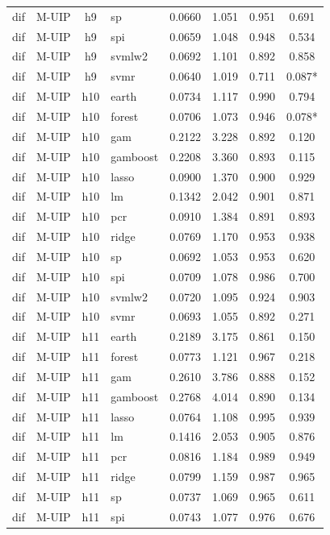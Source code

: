\begin{ThreePartTable}
\begin{longtable}[t]{llclcccc}
dif & M-UIP & h9 & sp & 0.0660 & 1.051 & 0.951 & 0.691\\
dif & M-UIP & h9 & spi & 0.0659 & 1.048 & 0.948 & 0.534\\
dif & M-UIP & h9 & svmlw2 & 0.0692 & 1.101 & 0.892 & 0.858\\
dif & M-UIP & h9 & svmr & 0.0640 & 1.019 & 0.711 & 0.087*\\
\addlinespace
dif & M-UIP & h10 & earth & 0.0734 & 1.117 & 0.990 & 0.794\\
dif & M-UIP & h10 & forest & 0.0706 & 1.073 & 0.946 & 0.078*\\
dif & M-UIP & h10 & gam & 0.2122 & 3.228 & 0.892 & 0.120\\
dif & M-UIP & h10 & gamboost & 0.2208 & 3.360 & 0.893 & 0.115\\
dif & M-UIP & h10 & lasso & 0.0900 & 1.370 & 0.900 & 0.929\\
dif & M-UIP & h10 & lm & 0.1342 & 2.042 & 0.901 & 0.871\\
dif & M-UIP & h10 & pcr & 0.0910 & 1.384 & 0.891 & 0.893\\
dif & M-UIP & h10 & ridge & 0.0769 & 1.170 & 0.953 & 0.938\\
dif & M-UIP & h10 & sp & 0.0692 & 1.053 & 0.953 & 0.620\\
dif & M-UIP & h10 & spi & 0.0709 & 1.078 & 0.986 & 0.700\\
dif & M-UIP & h10 & svmlw2 & 0.0720 & 1.095 & 0.924 & 0.903\\
dif & M-UIP & h10 & svmr & 0.0693 & 1.055 & 0.892 & 0.271\\
\addlinespace
dif & M-UIP & h11 & earth & 0.2189 & 3.175 & 0.861 & 0.150\\
dif & M-UIP & h11 & forest & 0.0773 & 1.121 & 0.967 & 0.218\\
dif & M-UIP & h11 & gam & 0.2610 & 3.786 & 0.888 & 0.152\\
dif & M-UIP & h11 & gamboost & 0.2768 & 4.014 & 0.890 & 0.134\\
dif & M-UIP & h11 & lasso & 0.0764 & 1.108 & 0.995 & 0.939\\
dif & M-UIP & h11 & lm & 0.1416 & 2.053 & 0.905 & 0.876\\
dif & M-UIP & h11 & pcr & 0.0816 & 1.184 & 0.989 & 0.949\\
dif & M-UIP & h11 & ridge & 0.0799 & 1.159 & 0.987 & 0.965\\
dif & M-UIP & h11 & sp & 0.0737 & 1.069 & 0.965 & 0.611\\
dif & M-UIP & h11 & spi & 0.0743 & 1.077 & 0.976 & 0.676\\

\end{longtable}
\end{ThreePartTable}
